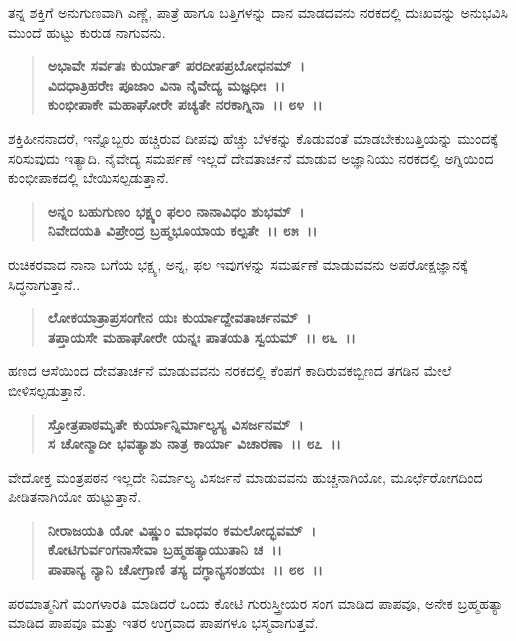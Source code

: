 ತನ್ನ ಶಕ್ತಿಗೆ ಅನುಗುಣವಾಗಿ ಎಣ್ಣೆ, ಪಾತ್ರೆ ಹಾಗೂ ಬತ್ತಿಗಳನ್ನು ದಾನ ಮಾಡದವನು ನರಕದಲ್ಲಿ ದುಃಖವನ್ನು ಅನುಭವಿಸಿ ಮುಂದೆ ಹುಟ್ಟು ಕುರುಡ ನಾಗುವನು.

\begin{verse}
\textbf{ಅಭಾವೇ ಸರ್ವತಃ ಕುರ್ಯಾತ್ ಪರದೀಪಪ್ರಬೋಧನಮ್~।}\\\textbf{ವಿದಧಾತ್ರಿಹರೇಃ ಪೂಜಾಂ ವಿನಾ ನೈವೇದ್ಯ ಮಜ್ಞಧೀಃ~।।}\\\textbf{ಕುಂಭೀಪಾಕೇ ಮಹಾಘೋರೇ ಪಚ್ಯತೇ ನರಕಾಗ್ನಿನಾ~।। ೮೪~।।}
\end{verse}

ಶಕ್ತಿಹೀನನಾದರೆ, ಇನ್ನೊಬ್ಬರು ಹಚ್ಚಿರುವ ದೀಪವು ಹೆಚ್ಚು ಬೆಳಕನ್ನು ಕೊಡುವಂತೆ ಮಾಡಬೇಕುಬತ್ತಿಯನ್ನು ಮುಂದಕ್ಕೆ ಸರಿಸುವುದು ಇತ್ಯಾದಿ. ನೈವೇದ್ಯ ಸಮರ್ಪಣೆ ಇಲ್ಲದೆ ದೇವತಾರ್ಚನೆ ಮಾಡುವ ಅಜ್ಞಾನಿಯು ನರಕದಲ್ಲಿ ಅಗ್ನಿಯಿಂದ ಕುಂಭೀಪಾಕದಲ್ಲಿ ಬೇಯಿಸಲ್ಪಡುತ್ತಾನೆ.

\begin{verse}
\textbf{ಅನ್ನಂ ಬಹುಗುಣಂ ಭಕ್ಷ್ಯಂ ಫಲಂ ನಾನಾವಿಧಂ ಶುಭಮ್~।}\\\textbf{ನಿವೇದಯತಿ ವಿಪ್ರೇಂದ್ರ ಬ್ರಹ್ಮಭೂಯಾಯ ಕಲ್ಪತೇ~।। ೮೫~।।}
\end{verse}

ರುಚಿಕರವಾದ ನಾನಾ ಬಗೆಯ ಭಕ್ಷ್ಯ, ಅನ್ನ, ಫಲ ಇವುಗಳನ್ನು ಸಮರ್ಷಣೆ ಮಾಡುವವನು ಅಪರೋಕ್ಷಜ್ಞಾನಕ್ಕೆ ಸಿದ್ಧನಾಗುತ್ತಾನೆ..

\begin{verse}
\textbf{ಲೋಕಯಾತ್ರಾಪ್ರಸಂಗೇನ ಯಃ ಕುರ್ಯಾದ್ದೇವತಾರ್ಚನಮ್~।}\\\textbf{ತಪ್ತಾಯಸೇ ಮಹಾಘೋರೇ ಯನ್ನಃ ಪಾತಯತಿ ಸ್ವಯಮ್~।। ೮೬~।।}
\end{verse}

ಹಣದ ಆಸೆಯಿಂದ ದೇವತಾರ್ಚನೆ ಮಾಡುವವನು ನರಕದಲ್ಲಿ ಕೆಂಪಗೆ ಕಾದಿರುವ\break ಕಬ್ಬಿಣದ ತಗಡಿನ ಮೇಲೆ ಬೀಳಿಸಲ್ಪಡುತ್ತಾನೆ.

\begin{verse}
\textbf{ಸ್ತೋತ್ರಪಾಠಮೃತೇ ಕುರ್ಯಾನ್ನಿರ್ಮಾಲ್ಯಸ್ಯ ವಿಸರ್ಜನಮ್~।}\\\textbf{ಸ ಚೋನ್ಮಾದೀ ಭವತ್ಯಾಶು ನಾತ್ರ ಕಾರ್ಯಾ ವಿಚಾರಣಾ~।। ೮೭~।।}
\end{verse}

ವೇದೋಕ್ತ ಮಂತ್ರಪಠನ ಇಲ್ಲದೇ ನಿರ್ಮಾಲ್ಯ ವಿಸರ್ಜನೆ ಮಾಡುವವನು ಹುಚ್ಚನಾಗಿಯೋ, ಮೂರ್ಛೆರೋಗದಿಂದ ಪೀಡಿತನಾಗಿಯೋ ಹುಟ್ಟುತ್ತಾನೆ.

\begin{verse}
\textbf{ನೀರಾಜಯತಿ ಯೋ ವಿಷ್ಣುಂ ಮಾಧವಂ ಕಮಲೋದ್ಭವಮ್~।}\\\textbf{ಕೋಟಿಗುರ್ವಂಗನಾಸೇವಾ ಬ್ರಹ್ಮಹತ್ಯಾಯುತಾನಿ ಚ~।।}\\\textbf{ಪಾಪಾನ್ಯ ನ್ಯಾನಿ ಚೋಗ್ರಾಣಿ ತಸ್ಯ ದಗ್ಧಾನ್ಯಸಂಶಯಃ~।। ೮೮~।।}
\end{verse}

ಪರಮಾತ್ಮನಿಗೆ ಮಂಗಳಾರತಿ ಮಾಡಿದರೆ ಒಂದು ಕೋಟಿ ಗುರುಸ್ತ್ರೀಯರ ಸಂಗ ಮಾಡಿದ ಪಾಪವೂ, ಅನೇಕ ಬ್ರಹ್ಮಹತ್ಯಾ ಮಾಡಿದ ಪಾಪವೂ ಮತ್ತು ಇತರ ಉಗ್ರವಾದ ಪಾಪಗಳೂ ಭಸ್ಮವಾಗುತ್ತವೆ.

